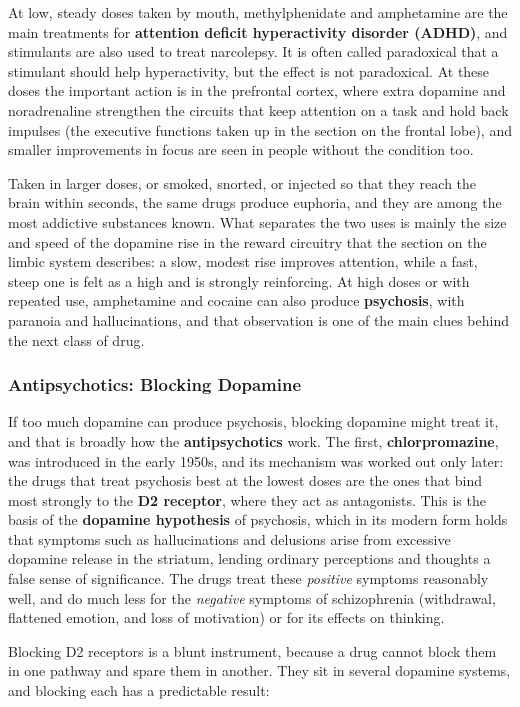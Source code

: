 \documentclass[11pt]{article}
\begin{document}
At low, steady doses taken by mouth, methylphenidate and amphetamine are the main treatments for \textbf{attention deficit hyperactivity disorder (ADHD)}, and stimulants are also used to treat narcolepsy. It is often called paradoxical that a stimulant should help hyperactivity, but the effect is not paradoxical. At these doses the important action is in the prefrontal cortex, where extra dopamine and noradrenaline strengthen the circuits that keep attention on a task and hold back impulses (the executive functions taken up in the section on the frontal lobe), and smaller improvements in focus are seen in people without the condition too.

Taken in larger doses, or smoked, snorted, or injected so that they reach the brain within seconds, the same drugs produce euphoria, and they are among the most addictive substances known. What separates the two uses is mainly the size and speed of the dopamine rise in the reward circuitry that the section on the limbic system describes: a slow, modest rise improves attention, while a fast, steep one is felt as a high and is strongly reinforcing. At high doses or with repeated use, amphetamine and cocaine can also produce \textbf{psychosis}, with paranoia and hallucinations, and that observation is one of the main clues behind the next class of drug.

\subsubsection{Antipsychotics: Blocking Dopamine}

If too much dopamine can produce psychosis, blocking dopamine might treat it, and that is broadly how the \textbf{antipsychotics} work. The first, \textbf{chlorpromazine}, was introduced in the early 1950s, and its mechanism was worked out only later: the drugs that treat psychosis best at the lowest doses are the ones that bind most strongly to the \textbf{D2 receptor}, where they act as antagonists. This is the basis of the \textbf{dopamine hypothesis} of psychosis, which in its modern form holds that symptoms such as hallucinations and delusions arise from excessive dopamine release in the striatum, lending ordinary perceptions and thoughts a false sense of significance. The drugs treat these \textit{positive} symptoms reasonably well, and do much less for the \textit{negative} symptoms of schizophrenia (withdrawal, flattened emotion, and loss of motivation) or for its effects on thinking.

Blocking D2 receptors is a blunt instrument, because a drug cannot block them in one pathway and spare them in another. They sit in several dopamine systems, and blocking each has a predictable result:
\end{document}
